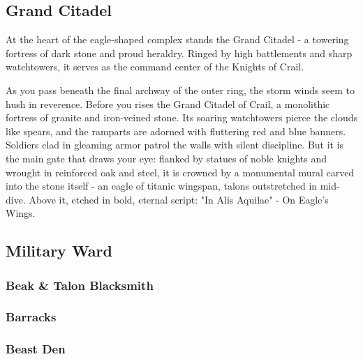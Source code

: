 \subsection*{ Grand Citadel}
{\entryfont At the heart of the eagle-shaped complex stands the Grand Citadel - a towering fortress of dark stone and proud heraldry. Ringed by high battlements and sharp watchtowers, it serves as the command center of the Knights of Crail.}
\begin{DndReadAloud}
	As you pass beneath the final archway of the outer ring, the storm winds seem to hush in reverence. Before you rises the Grand Citadel of Crail, a monolithic fortress of granite and iron-veined stone. Its soaring watchtowers pierce the clouds like spears, and the ramparts are adorned with fluttering red and blue banners. Soldiers clad in gleaming armor patrol the walls with silent discipline. But it is the main gate that draws your eye: flanked by statues of noble knights and wrought in reinforced oak and steel, it is crowned by a monumental mural carved into the stone itself - an eagle of titanic wingspan, talons outstretched in mid-dive. Above it, etched in bold, eternal script: "In Alis Aquilae" - On Eagle's Wings.
\end{DndReadAloud}
\subsection*{ Military Ward}
\subsubsection*{ Beak \& Talon Blacksmith}
\subsubsection*{ Barracks}
\subsubsection*{ Beast Den}

